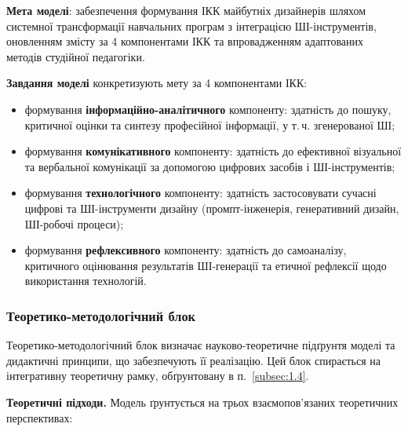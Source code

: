 \textbf{Мета моделі}: забезпечення формування ІКК майбутніх дизайнерів шляхом системної трансформації навчальних програм з інтеграцією ШІ-інструментів, оновленням змісту за 4 компонентами ІКК та впровадженням адаптованих методів студійної педагогіки.

\textbf{Завдання моделі} конкретизують мету за 4 компонентами ІКК:
\begin{itemize}
    \item формування \textbf{інформаційно-аналітичного} компоненту: здатність до пошуку, критичної оцінки та синтезу професійної інформації, у т.\,ч. згенерованої ШІ;
    \item формування \textbf{комунікативного} компоненту: здатність до ефективної візуальної та вербальної комунікації за допомогою цифрових засобів і ШІ-інструментів;
    \item формування \textbf{технологічного} компоненту: здатність застосовувати сучасні цифрові та ШІ-інструменти дизайну (промпт-інженерія, генеративний дизайн, ШІ-робочі процеси);
    \item формування \textbf{рефлексивного} компоненту: здатність до самоаналізу, критичного оцінювання результатів ШІ-генерації та етичної рефлексії щодо використання технологій.
\end{itemize}

\subsubsection{Теоретико-методологічний блок}\label{sssec:3.1.2}

Теоретико-методологічний блок визначає науково-теоретичне підґрунтя моделі та дидактичні принципи, що забезпечують її реалізацію. Цей блок спирається на інтегративну теоретичну рамку, обґрунтовану в п.~\ref{subsec:1.4}.

\textbf{Теоретичні підходи.} Модель ґрунтується на трьох взаємопов'язаних теоретичних перспективах:

